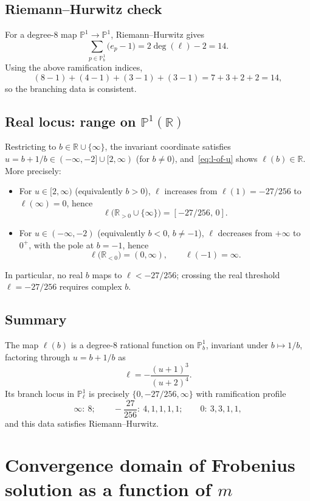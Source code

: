 \documentclass[11pt, a4paper]{article}
\newcommand{\PP}{\mathbb{P}}
\newcommand{\RR}{\mathbb{R}}
\numberwithin{equation}{section}
\begin{document}
\subsection{Riemann--Hurwitz check}
For a degree-$8$ map $\PP^1\to\PP^1$, Riemann--Hurwitz gives
\begin{equation}
  \sum_{p\in\PP^1_b}\bigl(e_p-1\bigr) = 2\deg(\ell)-2 = 14.
\end{equation}
Using the above ramification indices,
\begin{equation}
  (8-1)+(4-1)+(3-1)+(3-1)=7+3+2+2=14,
\end{equation}
so the branching data is consistent.

\subsection{Real locus: range on \texorpdfstring{$\PP^1(\RR)$}{P1(R)}}
Restricting to $b\in\RR\cup\{\infty\}$, the invariant coordinate satisfies $u=b+1/b\in(-\infty,-2]\cup[2,\infty)$ (for $b\neq 0$), and~\eqref{eq:l-of-u} shows $\ell(b)\in\RR$. More precisely:
\begin{itemize}
  \item For $u\in[2,\infty)$ (equivalently $b>0$), $\ell$ increases from
  \(\ell(1)=-27/256\) to \(\ell(\infty)=0\), hence
  \[
    \ell\bigl(\RR_{>0}\cup\{\infty\}\bigr)=[-27/256,\,0].
  \]
  \item For $u\in(-\infty,-2)$ (equivalently $b<0$, $b\neq -1$), $\ell$ decreases from
  \(+\infty\) to \(0^+\), with the pole at $b=-1$, hence
  \[
    \ell\bigl(\RR_{<0}\bigr)=(0,\infty),\qquad \ell(-1)=\infty.
  \]
\end{itemize}
In particular, no real $b$ maps to $\ell<-27/256$; crossing the real threshold $\ell=-27/256$ requires complex $b$.

\subsection{Summary}
The map $\ell(b)$ is a degree-$8$ rational function on $\PP^1_b$, invariant under $b\mapsto 1/b$, factoring through $u=b+1/b$ as
\[
  \ell = -\frac{(u+1)^3}{(u+2)^4}.
\]
Its branch locus in $\PP^1_\ell$ is precisely $\{0,-27/256,\infty\}$ with ramification profile
\[
  \infty:\ 8;\qquad
  -\frac{27}{256}:\ 4,1,1,1,1;\qquad
  0:\ 3,3,1,1,
\]
and this data satisfies Riemann--Hurwitz.



\section{Convergence domain of Frobenius solution as a function of \texorpdfstring{$m$}{m}}
\label{sec:convergence-domain-frobenius-m}
\end{document}
